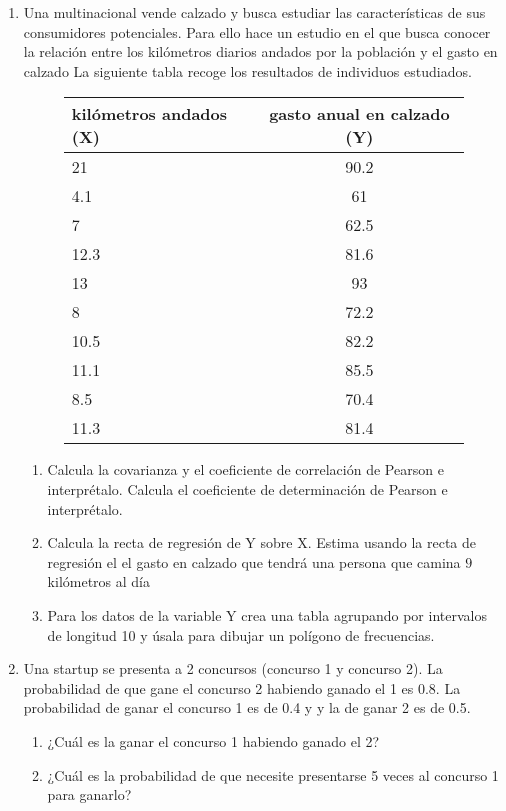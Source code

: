 \documentclass[]{article}
\theoremstyle{plain}
\theoremstyle{definition}
\theoremstyle{definition} %
\begin{document}
\begin{enumerate}
  \item 
  Una multinacional vende calzado y busca estudiar las características de sus consumidores potenciales.
  Para ello hace un estudio en el que busca conocer la relación entre los kilómetros diarios andados por la población y el gasto en calzado
  La siguiente tabla recoge los resultados de individuos estudiados.
 \begin{figure}
   \centering
   \begin{tabular}{lc}
     kilómetros andados (X) & gasto anual en calzado (Y)\\
     \hline
     21   & 90.2      \\  
     4.1  & 61         \\ 
     7    & 62.5       \\
     12.3 & 81.6      \\
     13   & 93        \\
     8    & 72.2       \\
     10.5 & 82.2      \\    
     11.1 & 85.5     \\
     8.5  & 70.4     \\
     11.3 & 81.4     \\
   \end{tabular}
 \end{figure}
 \begin{enumerate}
   \item
   Calcula la covarianza y el coeficiente de correlación de Pearson e
   interprétalo. Calcula el coeficiente de determinación de Pearson e interprétalo.
 \item
   Calcula la recta de regresión de Y sobre X. 
   Estima usando la recta de regresión el el gasto en calzado que tendrá una persona que camina $9$ kilómetros al día
 
 \item Para los datos de la variable Y crea una tabla agrupando por intervalos de longitud 10 y úsala para dibujar un polígono de frecuencias.
 \end{enumerate}
 
 
  \item  Una startup se presenta a 2 concursos (concurso 1 y concurso 2). 
  La probabilidad de que gane el concurso 2 habiendo ganado el 1 es 0.8. La probabilidad de ganar 
  el concurso 1 es de 0.4 y y la de ganar 2 es de 0.5. 
  \begin{enumerate}
    \item ¿Cuál es la ganar el concurso 1 habiendo ganado el 2?
    \item ¿Cuál es la probabilidad de que necesite presentarse 5 veces al concurso 1 para ganarlo?
  \end{enumerate}
 

\end{enumerate}
\end{document}
